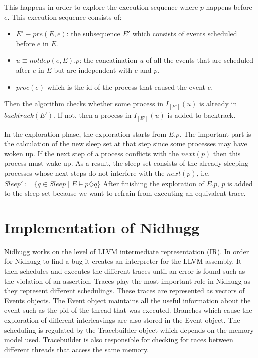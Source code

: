 This happens in order to explore the execution sequence where $p$ happens-before $e$.
This execution sequence consists of:
\begin{itemize} 
\item $E' \equiv pre(E,e)$: the subsequence $E'$ which consists of events scheduled before $e$ in $E$.
\item $u \equiv notdep(e,E).p$: the concatination $u$ of all the events that are scheduled after $e$ in $E$ but are independent with $e$ and $p$.
\item $proc(e)$ which is the id of the process that caused the event $e$.
\end{itemize}
Then the algorithm checks whether some process in $I_{[E']}(u)$ is already in $backtrack(E')$. 
If not, then a process in $I_{[E']}(u)$ is added to backtrack. 

In the exploration phase, the exploration starts from $E.p$. The important part is the calculation of the new sleep set at that step since some processes 
may have woken up.
If the next step of a process conflicts with the $next(p)$ then this process must wake up. As a result, the sleep set consists of the already sleeping processes
whose next steps do not interfere with the $next(p)$, i.e, $Sleep' := \{q \in Sleep \mid E \models p \diamondsuit q \} $ 
After finishing the exploration of $E.p$, $p$ is added to the sleep set because we want to refrain from executing an equivalent trace.

\section{Implementation of Nidhugg}

Nidhugg works on the level of LLVM intermediate representation (IR). In order for Nidhugg to find a bug it creates an interpreter for the LLVM assembly.
It then schedules and executes the different traces until an error is found such as the violation of an assertion.
Traces play the most important role in Nidhugg as they represent different schedulings. These traces are represented as vectors of Events objects.
The Event object maintains all the useful information about the event such as the pid of the thread that was executed. Branches which cause the exploration
of different interleavings are also stored in the Event object. The scheduling is regulated by the Tracebuilder object which depends on the memory model used.
Tracebuilder is also responsible for checking for races between different threads that access the same memory.

